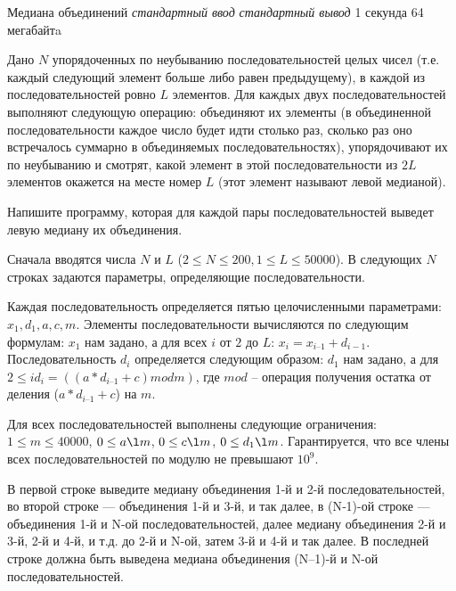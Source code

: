\begin{problem}%
{Медиана объединений}%
{\textsl{стандартный ввод}}%
{\textsl{стандартный вывод}}%
{1 секунда}%
{64 мегабайтa}{}

Дано $N$ упорядоченных по неубыванию последовательностей целых чисел (т.е. каждый следующий элемент больше либо равен предыдущему), в каждой из последовательностей ровно $L$ элементов. Для каждых двух последовательностей выполняют следующую операцию: объединяют их элементы (в объединенной последовательности каждое число будет идти столько раз, сколько раз оно встречалось суммарно в объединяемых последовательностях), упорядочивают их по неубыванию и смотрят, какой элемент в этой последовательности из $2L$ элементов окажется на месте номер $L$ (этот элемент называют левой медианой).

Напишите программу, которая для каждой пары последовательностей выведет левую медиану их объединения.

\InputFile

Сначала вводятся числа $N$ и $L$ ($2 \le N \le 200, 1 \le L \le 50000$). В следующих $N$ строках задаются параметры, определяющие последовательности.

Каждая последовательность определяется пятью целочисленными параметрами: $x_1, d_1, a, c, m$. Элементы последовательности вычисляются по следующим формулам: $x_1$ нам задано, а для всех $i$ от $2$ до $L$: $x_i = x_{i–1} + d_{i-1}$. Последовательность $d_i$ определяется следующим образом: $d_1$ нам задано, а для $2 \le i d_i=((a*d_{i–1}+c) mod m)$, где $mod$ – операция получения остатка от деления ($a*d_{i–1}+c$) на $m$.

Для всех последовательностей выполнены следующие ограничения: $1 \le m \le 40000$, $0 \le a \l m$, $0 \le c \l m$, $0 \le d_1 \l m$. Гарантируется, что все члены всех последовательностей по модулю не превышают $10^9$.

\OutputFile

В первой строке выведите медиану объединения 1-й и 2-й последовательностей, во второй строке — объединения 1-й и 3-й, и так далее, в (N‑1)-ой строке — объединения 1-й и N-ой последовательностей, далее медиану объединения 2-й и 3-й, 2-й и 4-й, и т.д. до 2-й и N-ой, затем 3-й и 4-й и так далее. В последней строке должна быть выведена медиана объединения (N–1)-й и N-ой последовательностей.
\Examples

\begin{example}
%
\end{example}
\end{problem}
